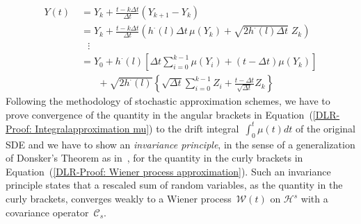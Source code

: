 \begin{align}
    Y(t) & \; = Y_k + \frac{t - k \Delta t}{\Delta t} (Y_{k+1} - Y_k) \nonumber  \\
    & \; = Y_k + \frac{t - k \Delta t}{\Delta t} (h^{\cdot}(l) \Delta t \, \mu(Y_k) +\sqrt{2h^{\cdot}(l) \Delta t } \; Z_k ) \nonumber \\
    & \quad \vdots \nonumber \\
    & \; = Y_0 + h^{\cdot}(l) \left[ \Delta t \sum_{i=0}^{k-1} \mu(Y_i) + (t - \Delta t) \mu(Y_k) \right] \label{DLR-Proof: Integralapproximation mu} \\ 
    & \qquad + \sqrt{2 h^{\cdot}(l)} \left\{ \sqrt{ \Delta t} \sum_{i=0}^{k-1} Z_i +  \frac{t - \Delta t}{\sqrt{\Delta t}} Z_k \right\} \label{DLR-Proof: Wiener process approximation}
\end{align}
Following the methodology of stochastic approximation schemes, we have to prove convergence of the quantity in the angular brackets in Equation~(\ref{DLR-Proof: Integralapproximation mu}) to the drift integral~$\int_0^t \mu (t) dt$ of the original SDE and we have to show an \textit{invariance principle}, in the sense of a generalization of Donsker's Theorem as in~\autocite{Revuz2005}, for the quantity in the curly brackets in Equation~(\ref{DLR-Proof: Wiener process approximation}). Such an invariance principle states  that a rescaled sum of random variables, as the quantity in the curly brackets, converges weakly to a Wiener process~$\mathcal{W}(t)$ on $\mathcal{H}^s$ with a covariance operator~$\mathcal{C}_s$. 



